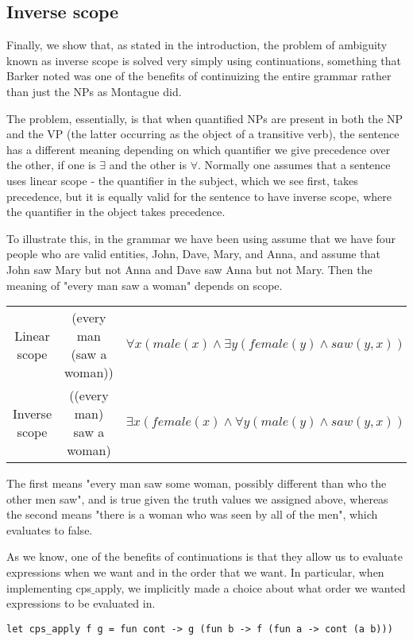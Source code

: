 \documentclass[11pt]{article} %
\begin{document}
\bigskip

\subsection{Inverse scope}

Finally, we show that, as stated in the introduction, the problem of ambiguity known as inverse scope is solved very simply using continuations, something that Barker noted was one of the benefits of continuizing the entire grammar rather than just the NPs as Montague did.

The problem, essentially, is that when quantified NPs are present in both the NP and the VP (the latter occurring as the object of a transitive verb), the sentence has a different meaning depending on which quantifier we give precedence over the other, if one is $\exists$ and the other is $\forall$. Normally one assumes that a sentence uses linear scope - the quantifier in the subject, which we see first, takes precedence, but it is equally valid for the sentence to have inverse scope, where the quantifier in the object takes precedence.

To illustrate this, in the grammar we have been using assume that we have four people who are valid entities, John, Dave, Mary, and Anna, and assume that John saw Mary but not Anna and Dave saw Anna but not Mary. Then the meaning of "every man saw a woman" depends on scope.
\bigskip

\begin{tabular}{|c c c|}
\hline
Linear scope & (every man (saw a woman)) & $\forall x (male(x) \wedge \exists y (female(y) \wedge saw(y, x)))$ \\
Inverse scope & ((every man) saw a woman) & $\exists x (female(x) \wedge \forall y (male(y) \wedge saw(y, x)))$ \\
\hline 
\end{tabular}
\bigskip

The first means "every man saw some woman, possibly different than who the other men saw", and is true given the truth values we assigned above, whereas the second means "there is a woman who was seen by all of the men", which evaluates to false.

As we know, one of the benefits of continuations is that they allow us to evaluate expressions when we want and in the order that we want. In particular, when implementing cps$\_$apply, we implicitly made a choice about what order we wanted expressions to be evaluated in.

\begin{lstlisting}
let cps_apply f g = fun cont -> g (fun b -> f (fun a -> cont (a b)))
\end{lstlisting}
\end{document}
